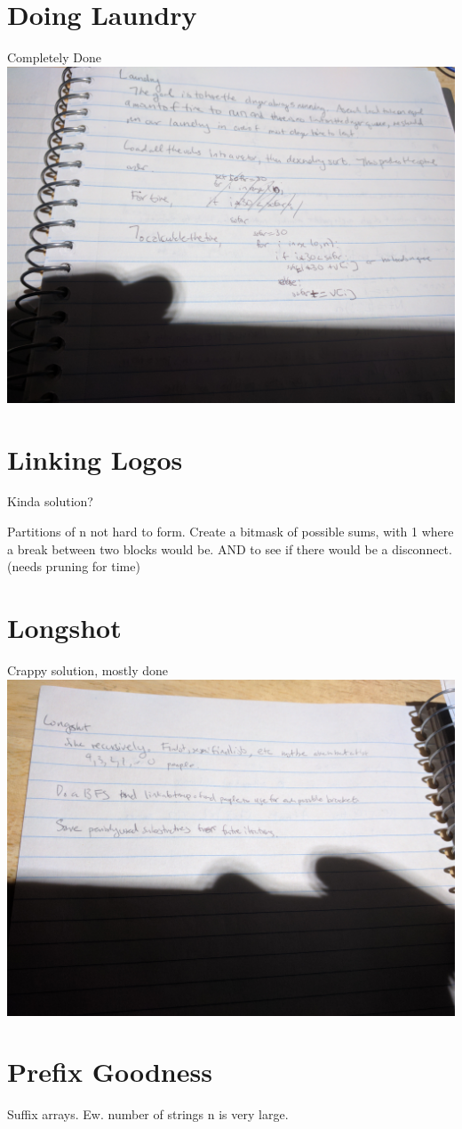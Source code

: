 \documentclass{article}
\begin{document}
\section{Doing Laundry}
Completely Done
\includegraphics[width=.75\textwidth]{laundry}

\section{Linking Logos}
Kinda solution?

Partitions of n not hard to form. Create a bitmask of possible sums, with 1 where a break between two blocks would be. AND to see if there would be a disconnect. (needs pruning for time)

\section{Longshot}
Crappy solution, mostly done
\includegraphics[width=.75\textwidth]{longshot}

\section{Prefix Goodness}
Suffix arrays. Ew. number of strings n is very large.
\end{document}
